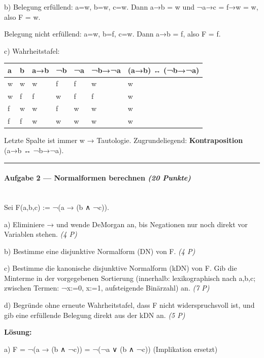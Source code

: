 \documentclass[11pt, a4paper]{article}
\begin{document}
b) Belegung erfüllend: a=w, b=w, c=w. Dann a→b = w und ¬a→c = f→w = w, also F = w.

Belegung nicht erfüllend: a=w, b=f, c=w. Dann a→b = f, also F = f.


c) Wahrheitstafel:



{\footnotesize
\begin{tabularx}{\linewidth}{XXXXXXX}
\hline
\rowcolor{tableheadbg}
{\color{white}\textbf{a}} & {\color{white}\textbf{b}} & {\color{white}\textbf{a→b}} & {\color{white}\textbf{¬b}} & {\color{white}\textbf{¬a}} & {\color{white}\textbf{¬b→¬a}} & {\color{white}\textbf{(a→b) ↔ (¬b→¬a)}} \\[2pt]
\hline
\endhead
\hline
\endfoot
w & w & w & f & f & w & w \\
w & f & f & w & f & f & w \\
f & w & w & f & w & w & w \\
f & f & w & w & w & w & w \\
\end{tabularx}
}


Letzte Spalte ist immer w → Tautologie. Zugrundeliegend: \textbf{Kontraposition} (a→b ↔ ¬b→¬a).



\noindent\textcolor{rulegray}{\rule{\linewidth}{0.4pt}}


\paragraph{Aufgabe 2 — Normalformen berechnen \textit{(20 Punkte)}}\mbox{}\\[2pt]

Sei F(a,b,c) := ¬(a → (b ∧ ¬c)).


a) Eliminiere → und wende DeMorgan an, bis Negationen nur noch direkt vor Variablen stehen. \textit{(4 P)}


b) Bestimme eine disjunktive Normalform (DN) von F. \textit{(4 P)}


c) Bestimme die kanonische disjunktive Normalform (kDN) von F. Gib die Minterme in der vorgegebenen Sortierung (innerhalb: lexikographisch nach a,b,c; zwischen Termen: ¬x:=0, x:=1, aufsteigende Binärzahl) an. \textit{(7 P)}


d) Begründe ohne erneute Wahrheitstafel, dass F nicht widerspruchsvoll ist, und gib eine erfüllende Belegung direkt aus der kDN an. \textit{(5 P)}


\textbf{Lösung:}


a) F = ¬(a → (b ∧ ¬c)) = ¬(¬a ∨ (b ∧ ¬c)) (Implikation ersetzt)
\end{document}
